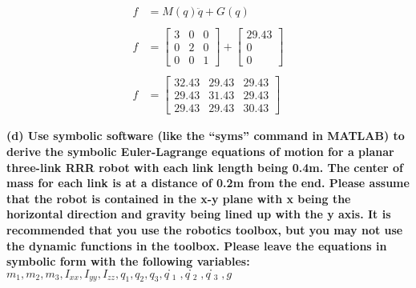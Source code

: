 \documentclass[11pt]{article}
\begin{document}
\begin{align}
f &= M(q)\ddot{q} + G(q) \\ \\
f &= \begin{bmatrix}
3 & 0 & 0 \\
0 & 2 & 0 \\
0 & 0 & 1 \end{bmatrix} + \begin{bmatrix}29.43\\0\\0\end{bmatrix}\\ \\
f &= \begin{bmatrix}
32.43 & 29.43 & 29.43 \\
29.43 & 31.43 & 29.43 \\
29.43 & 29.43 & 30.43 \end{bmatrix}
\end{align}

    \textbf{(d) Use symbolic software (like the ``syms'' command in MATLAB)
to derive the symbolic Euler-Lagrange equations of motion for a planar
three-link RRR robot with each link length being 0.4m. The center of
mass for each link is at a distance of 0.2m from the end. Please assume
that the robot is contained in the x-y plane with x being the horizontal
direction and gravity being lined up with the y axis. It is recommended
that you use the robotics toolbox, but you may not use the dynamic
functions in the toolbox. Please leave the equations in symbolic form
with the following variables:
\(m_1, m_2, m_3, I_{xx}, I_{yy}, I_{zz}, q_1, q_2, q_3, q̇_1 , q̇_2, q̇_3, g\)}
\end{document}
